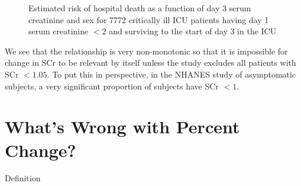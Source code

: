 \begin{Schunk}
\begin{figure}[htbp]
\caption[Hospital death as a function of creatinine]{Estimated risk of hospital death as a function of day 3 serum creatinine and sex for 7772 critically ill ICU patients having day 1 serum creatinine $< 2$ and surviving to the start of day 3 in the ICU}\label{fig:change-suppcr}
\end{figure}
\end{Schunk}
We see that the relationship is very non-monotonic so that it is
impossible for change in SCr to be relevant by itself unless the study
excludes all patients with SCr $< 1.05$.  To put this in perspective,
in the NHANES study of asymptomatic subjects, a very significant
proportion of subjects have SCr $< 1$.


\section{What's Wrong with Percent Change?} 
\bi
\item   Definition

